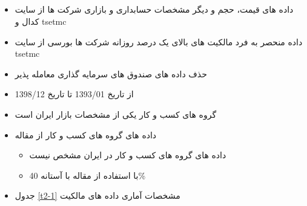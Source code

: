 \documentclass[12pt, a4paper]{article}
\begin{document}
\subsection{}
\begin{itemize}
	\item 
	داده های قیمت، حجم و دیگر مشخصات حسابداری و بازاری شرکت ها از سایت کدال و tsetmc
	\item
	داده منحصر به فرد مالکیت های بالای یک درصد روزانه شرکت ها بورسی از سایت 
	tsetmc
	\item 
	حذف داده های صندوق های سرمایه گذاری معامله پذیر
	\item 
	از تاریخ 1393/01 تا تاریخ 1398/12

	\item 
	گروه های کسب و کار یکی از مشخصات بازار ایران است
		\item 
	داده های گروه های کسب و کار از مقاله
	\cite{Aliabadi2022}
	\begin{itemize}
		\item 
		داده های گروه های کسب و کار در ایران مشخص نیست
		\item
		با استفاده از مقاله 
		\cite{almeida2011structure}
		با آستانه 40\%
		
	\end{itemize}
	\item
	جدول 
	\ref{t2-1}
	مشخصات آماری داده های مالکیت
\end{itemize}


\begin{LTR}
\end{LTR}
\end{document}
